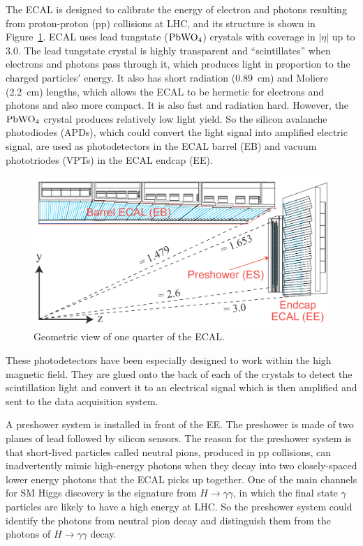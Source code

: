 The ECAL is designed to calibrate the energy of electron and photons resulting from proton-proton (pp) collisions at LHC, and its structure is shown in Figure~\ref{fig:ECAL}.  
ECAL uses lead tungstate (${\rm PbWO_4}$) crystals with coverage in $|\eta|$ up to 3.0. 
The lead tungstate crystal is highly transparent and ``scintillates'' when electrons and photons pass through it, which produces light in proportion to the charged particles$'$ energy. 
It also has short radiation (0.89~cm) and Moliere (2.2~cm) lengths, which allows the ECAL to be hermetic for electrons and photons and also more compact. It is also fast and radiation hard. However, 
the ${\rm PbWO_4}$ crystal produces relatively low light yield.
So the silicon avalanche photodiodes (APDs), which could convert the light signal into amplified electric signal, are used as photodetectors in the ECAL barrel (EB) and 
vacuum phototriodes (VPTs) in the ECAL endcap (EE). 
 
 
\begin{figure}[!htbp]
\centering
\includegraphics[width=.9\textwidth]{figures/ECALEta.png}
\caption{Geometric view of one quarter of the ECAL.}
\label{fig:ECAL}
\end{figure}

  
These photodetectors have been especially designed to work within the high magnetic field. They are glued onto the back of each of the crystals to detect the scintillation light and convert it to an electrical signal which is then amplified and sent to the data acquisition system.
 
 A preshower system is installed in front of the EE.  
The preshower is made of two planes of lead followed by silicon sensors. 
The reason for the preshower system is that short-lived particles called neutral pions, produced in pp collisions, can inadvertently mimic high-energy photons when they decay into two closely-spaced lower energy photons that the ECAL picks up together. 
One of the main channels for SM Higgs discovery is the signature from $H \to \gamma \gamma$, 
in which the final state $\gamma$ particles are likely to have a high energy at LHC. 
So the preshower system could identify the photons from neutral pion decay and distinguish them from the photons of $H \to \gamma \gamma$  decay.
  

